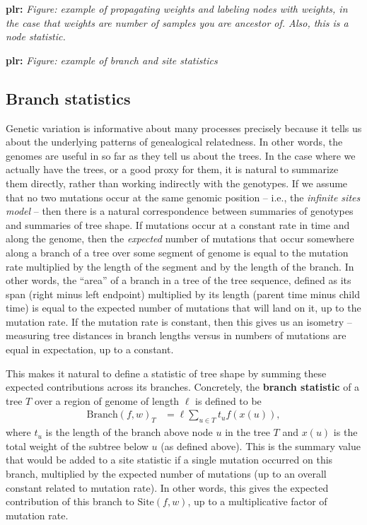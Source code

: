 \documentclass{article}
\newcommand{\branch}{\mbox{Branch}} %
\newcommand{\site}{\mbox{Site}} %
\newcommand{\iw}{w} %
\newcommand{\nw}{x} %
\newcommand{\plr}[1]{{\color{blue}\textbf{plr:} \it #1}}
\begin{document}
\plr{Figure: example of propagating weights and labeling nodes with weights,
    in the case that weights are number of samples you are ancestor of.
    Also, this is a node statistic.}

\plr{Figure: example of branch and site statistics}


\subsection*{Branch statistics}

Genetic variation is informative about many processes
precisely because it tells us about the underlying patterns of genealogical relatedness.
In other words, the genomes are useful in so far as they tell us about the trees.
In the case where we actually have the trees, or a good proxy for them,
it is natural to summarize them directly, rather than working indirectly with the genotypes.
If we assume that no two mutations occur at the same genomic position --
i.e., the \emph{infinite sites model} --
then there is a natural correspondence between summaries of genotypes and summaries of tree shape.
If mutations occur at a constant rate in time and along the genome,
then the \emph{expected} number of mutations that occur somewhere along a branch of a tree
over some segment of genome
is equal to the mutation rate multiplied by the length of the segment and by the length of the branch.
In other words, the ``area'' of a branch in a tree of the tree sequence,
defined as its span (right minus left endpoint) multiplied by its length (parent time minus child time)
is equal to the expected number of mutations that will land on it, up to the mutation rate.
If the mutation rate is constant,
then this gives us an isometry --
measuring tree distances in branch lengths versus in numbers of mutations
are equal in expectation, up to a constant.

This makes it natural to define 
a statistic of tree shape by summing these expected contributions across its branches.
Concretely, the \textbf{branch statistic} of a tree $T$
over a region of genome of length $\ell$
is defined to be
\begin{align}
    \branch(f, \iw)_T
    &=
    \ell \sum_{u \in T} t_u f(\nw(u))  ,
\end{align}
where $t_u$ is the length of the branch above node $u$ in the tree $T$
and $\nw(u)$ is the total weight of the subtree below $u$ (as defined above).
This is the summary value that would be added to a site statistic
if a single mutation occurred on this branch,
multiplied by the expected number of mutations 
(up to an overall constant related to mutation rate).
In other words,
this gives the expected contribution of this branch to $\site(f, \iw)$,
up to a multiplicative factor of mutation rate.
\end{document}
